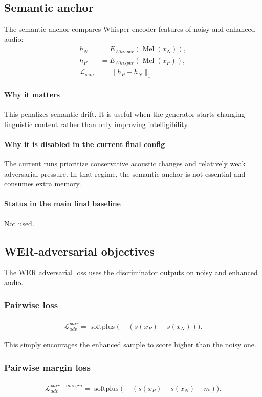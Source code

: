 \documentclass[11pt]{article}
\begin{document}
\subsection{Semantic anchor}
The semantic anchor compares Whisper encoder features of noisy and enhanced audio:
\begin{align}
    h_N &= E_{Whisper}(\operatorname{Mel}(x_N)), \\
    h_P &= E_{Whisper}(\operatorname{Mel}(x_P)), \\
    \mathcal{L}_{sem} &= \|h_P - h_N\|_1.
\end{align}

\paragraph{Why it matters}
This penalizes semantic drift. It is useful when the generator starts changing linguistic content rather than only improving intelligibility.

\paragraph{Why it is disabled in the current final config}
The current runs prioritize conservative acoustic changes and relatively weak adversarial pressure. In that regime, the semantic anchor is not essential and consumes extra memory.

\paragraph{Status in the main final baseline}
Not used.

\subsection{WER-adversarial objectives}
The WER adversarial loss uses the discriminator outputs on noisy and enhanced audio.

\subsubsection{Pairwise loss}
\begin{align}
    \mathcal{L}_{adv}^{pair} = \operatorname{softplus}\big(-(s(x_P) - s(x_N))\big).
\end{align}

This simply encourages the enhanced sample to score higher than the noisy one.

\subsubsection{Pairwise margin loss}
\begin{align}
    \mathcal{L}_{adv}^{pair-margin} = \operatorname{softplus}\big(-(s(x_P) - s(x_N) - m)\big).
\end{align}
\end{document}
